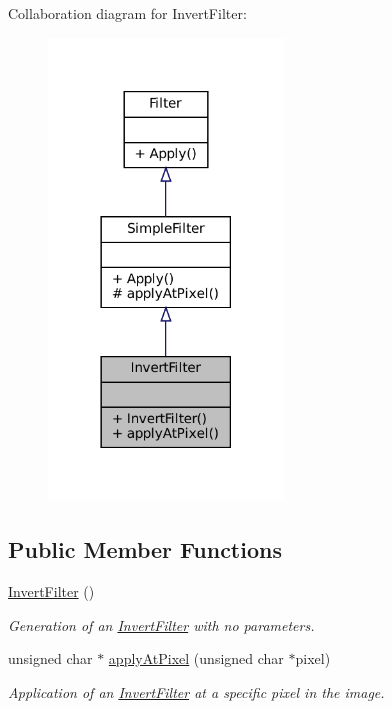 Collaboration diagram for Invert\+Filter\+:
\nopagebreak
\begin{figure}[H]
\begin{center}
\leavevmode
\includegraphics[width=177pt]{classInvertFilter__coll__graph}
\end{center}
\end{figure}
\subsection*{Public Member Functions}
\begin{DoxyCompactItemize}
\item 
\mbox{\label{classInvertFilter_a30c32de66e0b4cd40174af651185d955}} 
\hyperlink{classInvertFilter_a30c32de66e0b4cd40174af651185d955}{Invert\+Filter} ()
\begin{DoxyCompactList}\small\item\em Generation of an \hyperlink{classInvertFilter}{Invert\+Filter} with no parameters. \end{DoxyCompactList}\item 
\mbox{\label{classInvertFilter_a440496aa9fb53511c32e451aaefb52a4}} 
unsigned char $\ast$ \hyperlink{classInvertFilter_a440496aa9fb53511c32e451aaefb52a4}{apply\+At\+Pixel} (unsigned char $\ast$pixel)
\begin{DoxyCompactList}\small\item\em Application of an \hyperlink{classInvertFilter}{Invert\+Filter} at a specific pixel in the image. \end{DoxyCompactList}\end{DoxyCompactItemize}
